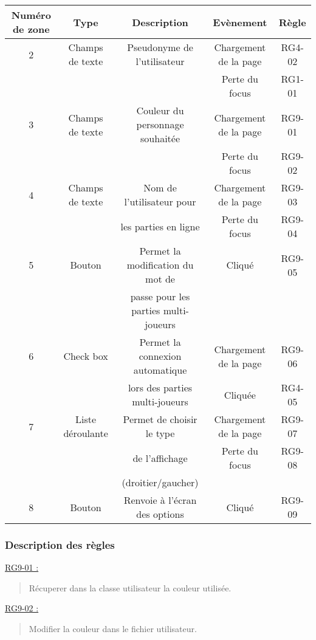 \documentclass{report}
\begin{document}
			\begin{tabular}{|c|c|c|c|c|} \hline
				Numéro de zone & Type  & Description & Evènement &	Règle \\\hline
				2 & Champs de texte & Pseudonyme de l'utilisateur & Chargement de la page & RG4-02 \\
				  &                 &                             & Perte du focus & RG1-01 \\\hline
				3 & Champs de texte & Couleur du personnage souhaitée & Chargement de la page & RG9-01 \\
				  &                 &                             & Perte du focus & RG9-02 \\\hline
				4 & Champs de texte & Nom de l'utilisateur pour & Chargement de la page & RG9-03 \\
				  &                 & les parties en ligne      & Perte du focus & RG9-04 \\\hline
				5 & Bouton & Permet la modification du mot de & Cliqué & RG9-05 \\
				  &        & passe pour les parties multi-joueurs & & \\\hline
				6 & Check box & Permet la connexion automatique & Chargement de la page & RG9-06 \\
				  &           & lors des parties multi-joueurs  & Cliquée               & RG4-05 \\\hline
				7 & Liste déroulante & Permet de choisir le type & Chargement de la page & RG9-07 \\
				  &				     & de l'affichage            & Perte du focus & RG9-08 \\
				  &				     & (droitier/gaucher)        & & \\\hline
				8 & Bouton & Renvoie à l'écran des options & Cliqué & RG9-09 \\\hline

			\end{tabular}
			
		\subsubsection{Description des règles}

			\underline{RG9-01 :}
				\begin{quote}
					Récuperer dans la classe utilisateur la couleur utilisée.\\
				\end{quote}


			\underline{RG9-02 :}
				\begin{quote}
					Modifier la couleur dans le fichier utilisateur.\\
				\end{quote}
\end{document}
